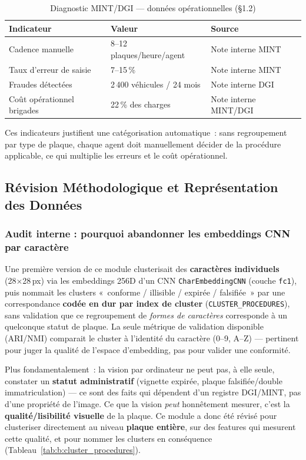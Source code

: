 \begin{table}[H]
  \centering
  \caption{Diagnostic MINT/DGI — données opérationnelles (§1.2)}
  \label{tab:b:diagnostic_mintdgi}
  \begin{tabular}{lll}
    \hline
    \textbf{Indicateur} & \textbf{Valeur} & \textbf{Source} \\
    \hline
    Cadence manuelle & 8–12 plaques/heure/agent & Note interne MINT \\
    Taux d'erreur de saisie & 7–15\,\% & Note interne MINT \\
    Fraudes détectées & 2\,400 véhicules / 24 mois & Note interne DGI \\
    Coût opérationnel brigades & 22\,\% des charges & Note interne
      MINT/DGI \\
    \hline
  \end{tabular}
\end{table}

Ces indicateurs justifient une catégorisation automatique~: sans
regroupement par type de plaque, chaque agent doit manuellement
décider de la procédure applicable, ce qui multiplie les erreurs et
le coût opérationnel.

\subsection{Révision Méthodologique et Représentation des Données}
\label{sec:b:embeddings}

\subsubsection{Audit interne : pourquoi abandonner les embeddings CNN par caractère}

Une première version de ce module clusterisait des
\textbf{caractères individuels} (28×28\,px) via les embeddings 256D
d'un CNN \texttt{CharEmbeddingCNN} (couche \texttt{fc1}), puis nommait
les clusters «~conforme / illisible / expirée / falsifiée~» par
une correspondance \textbf{codée en dur par index de cluster}
(\texttt{CLUSTER\_PROCEDURES}), sans validation que ce regroupement de
\textit{formes de caractères} corresponde à un quelconque statut de
plaque. La seule métrique de validation disponible (ARI/NMI) comparait
le cluster à l'identité du caractère (0–9, A–Z) — pertinent pour juger
la qualité de l'espace d'embedding, pas pour valider une conformité.

Plus fondamentalement~: la vision par ordinateur ne peut pas, à elle
seule, constater un \textbf{statut administratif} (vignette expirée,
plaque falsifiée/double immatriculation) — ce sont des faits qui
dépendent d'un registre DGI/MINT, pas d'une propriété de l'image. Ce
que la vision \textit{peut} honnêtement mesurer, c'est la
\textbf{qualité/lisibilité visuelle} de la plaque. Ce module a donc été
révisé pour clusteriser directement au niveau \textbf{plaque entière},
sur des features qui mesurent cette qualité, et pour nommer les
clusters en conséquence (Tableau~\ref{tab:b:cluster_procedures}).

